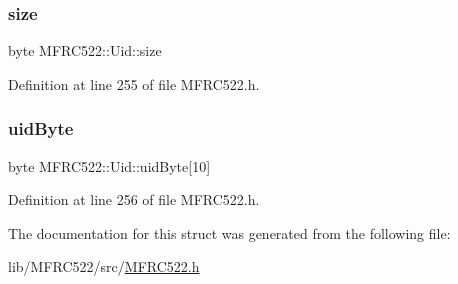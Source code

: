 \subsubsection{\texorpdfstring{size}{size}}
{\footnotesize\ttfamily byte M\+F\+R\+C522\+::\+Uid\+::size}



Definition at line 255 of file M\+F\+R\+C522.\+h.

\mbox{\label{struct_m_f_r_c522_1_1_uid_a5581167c1e1c8beb98c44ff86f4fbc52}} 
\subsubsection{\texorpdfstring{uid\+Byte}{uidByte}}
{\footnotesize\ttfamily byte M\+F\+R\+C522\+::\+Uid\+::uid\+Byte\mbox{[}10\mbox{]}}



Definition at line 256 of file M\+F\+R\+C522.\+h.



The documentation for this struct was generated from the following file\+:\begin{DoxyCompactItemize}
\item 
lib/\+M\+F\+R\+C522/src/\hyperlink{_m_f_r_c522_8h}{M\+F\+R\+C522.\+h}\end{DoxyCompactItemize}

